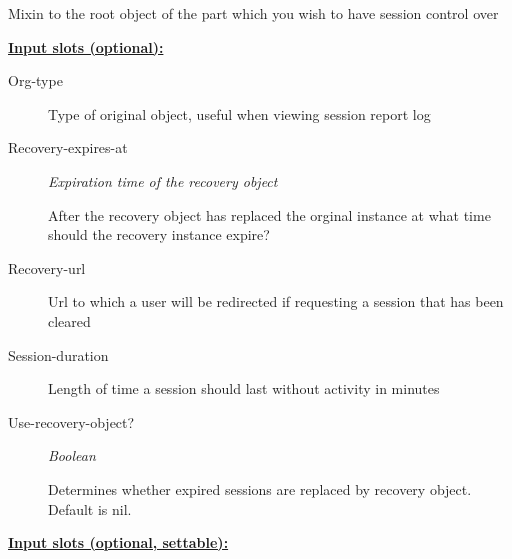 \documentclass [11pt]{book}
\begin{document}
\begin{itemize}
\begin{description}
Mixin to the root object of the part which you wish to have session control over



\end{description}








\textbf{
\underline{Input slots (optional):}}

\begin{description}

\item [Org-type]

Type of original object, useful when viewing session report log




\item [Recovery-expires-at]
\emph{Expiration time of the recovery object}

 After the recovery object has replaced the orginal
instance at what time should the recovery instance expire?




\item [Recovery-url]

Url to which a user will be redirected if requesting a session that has been cleared




\item [Session-duration]

Length of time a session should last without activity in minutes




\item [Use-recovery-object?]
\emph{Boolean}

 Determines whether expired sessions are replaced by recovery object. Default is nil.




\end{description}






\textbf{
\underline{Input slots (optional, settable):}}

\begin{description}


\end{description}
\end{itemize}
\end{document}
